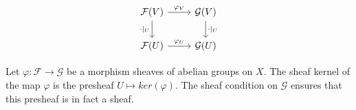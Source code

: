 \[\begin{tikzcd}
	{\mathcal{F}(V)} & {\mathcal{G}(V)} \\
	{\mathcal{F}(U)} & {\mathcal{G}(U)}
	\arrow["{\cdot|_U}"', from=1-1, to=2-1]
	\arrow["{\varphi_V}", from=1-1, to=1-2]
	\arrow["{\cdot|_U}", from=1-2, to=2-2]
	\arrow["{\varphi_U}", from=2-1, to=2-2]
\end{tikzcd}\]

Let $\varphi : \mathcal{F} \to \mathcal{G}$ be a morphism sheaves of abelian groups on $X$. The sheaf kernel of the map $\varphi$ is the presheaf $U \mapsto ker(\varphi)$. The sheaf condition on $\mathcal{G}$ ensures that this presheaf is in fact a sheaf.


